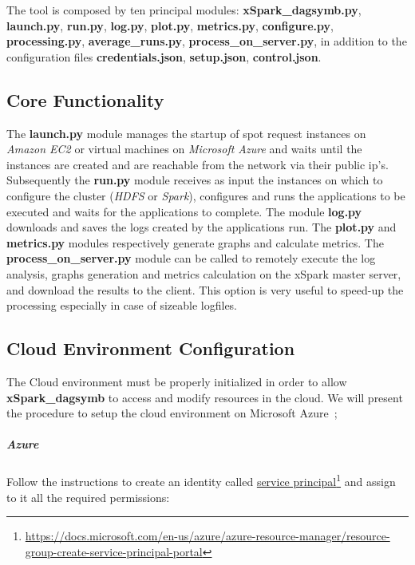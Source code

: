 The tool is composed by ten principal modules:
\textbf{xSpark\_dagsymb.py}, \textbf{launch.py}, \textbf{run.py},
\textbf{log.py}, \textbf{plot.py}, \textbf{metrics.py},
\textbf{configure.py}, \textbf{processing.py},
\textbf{average\_runs.py}, \textbf{process\_on\_server.py}, in addition
to the configuration files \textbf{credentials.json},
\textbf{setup.json}, \textbf{control.json}.

\hypertarget{core-functionality}{%
\subsection{Core Functionality}\label{core-functionality}}

The \textbf{launch.py} module manages the startup of spot request
instances on \emph{Amazon EC2} or virtual machines on \emph{Microsoft
Azure} and waits until the instances are created and are reachable from
the network via their public ip's. Subsequently the \textbf{run.py}
module receives as input the instances on which to configure the cluster
(\emph{HDFS} or \emph{Spark}), configures and runs the applications to
be executed and waits for the applications to complete. The module
\textbf{log.py} downloads and saves the logs created by the applications
run. The \textbf{plot.py} and \textbf{metrics.py} modules respectively
generate graphs and calculate metrics. The
\textbf{process\_on\_server.py} module can be called to remotely execute
the log analysis, graphs generation and metrics calculation on the
xSpark master server, and download the results to the client. This
option is very useful to speed-up the processing especially in case of
sizeable logfiles.

\hypertarget{cloud-environment-configuration}{%
\subsection{Cloud Environment
	Configuration}\label{cloud-environment-configuration}}

The Cloud environment must be properly initialized in order to allow
\textbf{xSpark\_dagsymb} to access and modify resources in the cloud.
We will present the procedure to setup the cloud environment on Microsoft Azure~\cite{Azure};

\hypertarget{azure}{%
\subparagraph{Azure}\label{azure}}

Follow the instructions to create an identity called
\href{https://docs.microsoft.com/en-us/azure/azure-resource-manager/resource-group-create-service-principal-portal}{service
principal}\footnote{\url{https://docs.microsoft.com/en-us/azure/azure-resource-manager/resource-group-create-service-principal-portal}} and assign to it all the required permissions:

